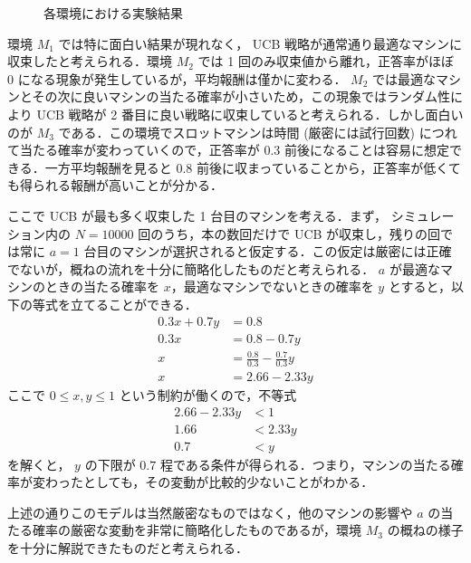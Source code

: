 \documentclass{jsarticle}
\newlength{\figwidth}
\begin{document}
\begin{figure}[H]
\centering
{}
\caption{各環境における実験結果}\label{fig:hk1}
\end{figure}

環境 $M_1$ では特に面白い結果が現れなく， UCB 戦略が通常通り最適なマシンに収束したと考えられる．環境 $M_2$ では 1 回のみ収束値から離れ，正答率がほぼ 0 になる現象が発生しているが，平均報酬は僅かに変わる． $M_2$ では最適なマシンとその次に良いマシンの当たる確率が小さいため，この現象ではランダム性により UCB 戦略が 2 番目に良い戦略に収束していると考えられる．しかし面白いのが $M_3$ である．この環境でスロットマシンは時間 (厳密には試行回数) につれて当たる確率が変わっていくので，正答率が 0.3 前後になることは容易に想定できる．一方平均報酬を見ると 0.8 前後に収まっていることから，正答率が低くても得られる報酬が高いことが分かる．

ここで UCB が最も多く収束した 1 台目のマシンを考える．まず， シミュレーション内の $N = 10000$ 回のうち，本の数回だけで UCB が収束し，残りの回では常に $ a = 1 $ 台目のマシンが選択されると仮定する．この仮定は厳密には正確でないが，概ねの流れを十分に簡略化したものだと考えられる． $a$ が最適なマシンのときの当たる確率を $x$，最適なマシンでないときの確率を $y$ とすると，以下の等式を立てることができる．
\begin{align}
  0.3x + 0.7y &= 0.8 \\
  0.3x &= 0.8 - 0.7y \\
  x &= \frac{0.8}{0.3} - \frac{0.7}{0.3}y \\
  x &= 2.66 - 2.33y
\end{align}
ここで $0 \leq x, y \leq 1$ という制約が働くので，不等式
\begin{align}
  2.66 - 2.33y &< 1 \\
  1.66 &< 2.33y \\
  0.7 &< y
\end{align}
を解くと， $y$ の下限が $0.7$ 程である条件が得られる．つまり，マシンの当たる確率が変わったとしても，その変動が比較的少ないことがわかる．

上述の通りこのモデルは当然厳密なものではなく，他のマシンの影響や $a$ の当たる確率の厳密な変動を非常に簡略化したものであるが，環境 $M_3$ の概ねの様子を十分に解説できたものだと考えられる．
\end{document}
